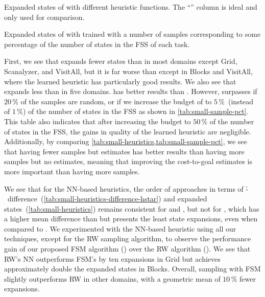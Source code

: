 \begin{table}[tb]
    \caption[Expanded states of different heuristic functions.]{Expanded states of \gbfs with different heuristic functions. The ``\hstar'' column is ideal and only used for comparison.}
    \addmargin
    \label{tab:small-heuristics}
    \centering
    
\end{table}

\begin{table}[tb]
    \caption[Expanded states from different sample set sizes.]{Expanded states of \gbfs with \hnnl{\rlmeanfx} trained with a number of samples corresponding to some percentage of the number of states in the FSS of each task.}
    \label{tab:small-sample-pct}
    \addmargin
    \centering
    
\end{table}

First, we see that \hnnbase expands fewer states than \hgc in most domains except Grid, Scanalyzer, and VisitAll, but it is far worse than \hff except in Blocks and VisitAll, where the learned heuristic has particularly good results. We also see that \hnnl{\rlmeanfx} expands less than \hnnbase in five domains. \hff has better results than \hnnl{\rlmeanfx}. However, \hnnl{\rlmeanfx} surpasses \hff if $20\,\%$ of the samples are random, or if we increase the budget of \hnnl{\rlmeanfx} to $5\,\%$~(instead of $1\,\%$) of the number of states in the FSS as shown in \cref{tab:small-sample-pct}. This table also indicates that after increasing the budget to $50\,\%$ of the number of states in the FSS, the gains in quality of the learned heuristic are negligible. Additionally, by comparing \cref{tab:small-heuristics,tab:small-sample-pct}, we see that having fewer samples but \hstar estimates has better results than having more samples but no \hstar estimates, meaning that improving the cost-to-goal estimates is more important than having more samples.

We see that for the NN-based heuristics, the order of approaches in terms of \mbox{\h-\hstar}~difference~(\cref{tab:small-heuristics-difference-hstar}) and expanded states~(\cref{tab:small-heuristics}) remains consistent for \hnnbase and \hnnl{\rlmeanfx}, but not for \hnnrs, which has a higher mean difference than \hnnl{\rlmeanfx} but presents the least state expansions, even when compared to \hff. We experimented with the NN-based heuristic using all our techniques, except for the RW sampling algorithm, to observe the performance gain of our proposed FSM algorithm (\hnnrs) over the RW algorithm (\hnnrwrs). We see that RW's NN outperforms FSM's by ten expansions in Grid but achieves approximately double the expanded states in Blocks. Overall, sampling with FSM slightly outperforms RW in other domains, with a geometric mean of $10\,\%$ fewer expansions.

